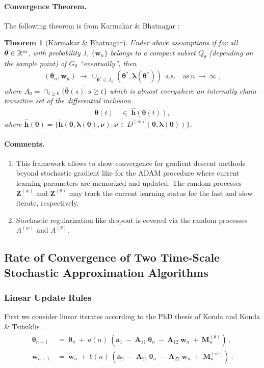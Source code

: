 \documentclass{article}
\newtheorem{theorem}{Theorem}
\newcommand\Ba{\bm{a}}
\newcommand\Bh{\bm{h}}
\newcommand\Bw{\bm{w}}
\newcommand\BA{\bm{A}}
\newcommand\BM{\bm{M}}
\newcommand\BZ{\bm{Z}}
\newcommand\Bla{\bm{\lambda}}
\newcommand\Bnu{\bm{\nu}}
\newcommand\Bth{\bm{\theta}}
\renewcommand{\geq}{\geqslant}
\begin{document}
\paragraph{Convergence Theorem.}
The following theorem is from Karmakar \& Bhatnagar \cite{Karmakar:17}:
\begin{theorem}[Karmakar \& Bhatnagar]
\label{th:karmakar}
Under above assumptions
if for all $\Bth \in \dR^m$, with probability 1, $\{\Bw_n\}$
belongs to a compact subset $Q_\theta$ (depending
on the sample point) of $G_\theta$ ``eventually'', then
\begin{align}
(\Bth_n, \Bw_n) \ \to \ \cup_{\Bth^* \in A_0}(\Bth^*, \Bla(\Bth^*))
\ \ \text{a.s.} \quad \text{as} \ n \ \to \ \infty \ ,
\end{align}
where $A_0 = \cap_{t\geq 0}\overline{\{\bar{\Bth}(s): s\geq t\}}$
which is almost everywhere an internally chain transitive set
of the differential inclusion
\begin{align}
\dot{\Bth}(t) \ &\in \ \hat{\Bh}(\Bth(t)),
\end{align}
where $\hat{\Bh}(\Bth)=\{\tilde{\Bh}(\Bth,\Bla(\Bth),\Bnu) :  \Bnu
\in D^{(w)}(\Bth, \Bla(\Bth))\}$.
\end{theorem}


\paragraph{Comments.}
\begin{enumerate}[label=\textbf{(C\arabic*)}]
\item
This framework allows to show convergence for gradient descent methods
beyond stochastic gradient
like for the ADAM procedure where current learning parameters are
memorized and updated.
The random processes $\BZ^{(w)}$ and $\BZ^{(\theta)}$ may track the
current learning status for the fast and slow iterate, respectively.
\item
Stochastic regularization like dropout is covered via
the random processes $A^{(w)}$ and $A^{(\theta)}$.
\end{enumerate}


\subsection{Rate of Convergence of Two Time-Scale Stochastic  Approximation
Algorithms}
\label{sec:convergenceRate}


\subsubsection{Linear Update Rules}
\label{sec:linur}
First we consider linear iterates according to the PhD thesis of Konda
\cite{Konda:02} and Konda \& Tsitsiklis \cite{Konda:04}.
\begin{align}
\label{eq:iter1ConvLinear}
\Bth_{n+1} \ &= \ \Bth_n \ + \ a(n) \ \left(\Ba_1 \ - \ \BA_{11} \
               \Bth_n \ - \ \BA_{12} \ \Bw_n \ + \ \BM^{(\theta)}_{n}\right) \ ,\\
\label{eq:iter2ConvLinear}
\Bw_{n+1} \ &= \ \Bw_n  \ + \ b(n)\ \left(\Ba_2  \ - \ \BA_{21} \
               \Bth_n \ - \ \BA_{22} \ \Bw_n \ + \ \BM^{(w)}_{n}\right) \ .
\end{align}
\end{document}

